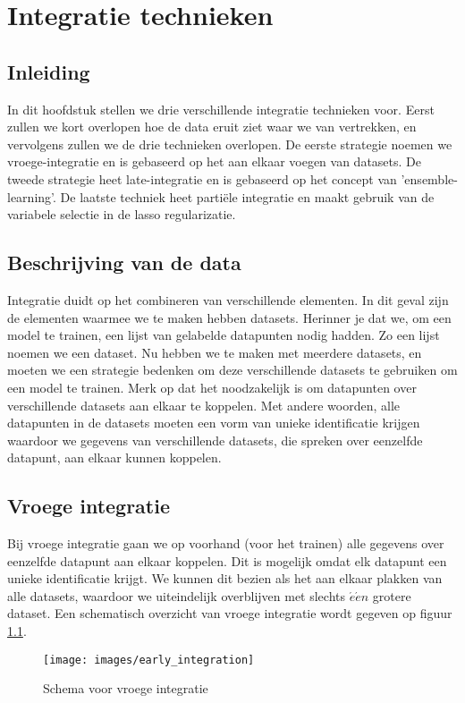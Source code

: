 \chapter{Integratie technieken}
\label{cha:D:integratie}

\section{Inleiding}
\label{sec:D:integratie-inleiding}
In dit hoofdstuk stellen we drie verschillende integratie technieken voor. Eerst zullen we kort overlopen hoe de data eruit ziet waar we van vertrekken, en vervolgens zullen we de drie technieken overlopen. De eerste strategie noemen we vroege-integratie en is gebaseerd op het aan elkaar voegen van datasets. De tweede strategie heet late-integratie en is gebaseerd op het concept van 'ensemble-learning'. De laatste techniek heet parti\"ele integratie en maakt gebruik van de variabele selectie in de lasso regularizatie. 

\section{Beschrijving van de data}
\label{sec:D:integratie-beschrijving}
Integratie duidt op het combineren van verschillende elementen. In dit geval zijn de elementen waarmee we te maken hebben datasets. Herinner je dat we, om een model te trainen, een lijst van gelabelde datapunten nodig hadden. Zo een lijst noemen we een dataset. Nu hebben we te maken met meerdere datasets, en moeten we een strategie bedenken om deze verschillende datasets te gebruiken om een model te trainen. Merk op dat het noodzakelijk is om datapunten over verschillende datasets aan elkaar te koppelen. Met andere woorden, alle datapunten in de datasets moeten een vorm van unieke identificatie krijgen waardoor we gegevens van verschillende datasets, die spreken over eenzelfde datapunt, aan elkaar kunnen koppelen.

\section{Vroege integratie}
\label{sec:D:integratie-vroeg}
Bij vroege integratie gaan we op voorhand (voor het trainen) alle gegevens over eenzelfde datapunt aan elkaar koppelen. Dit is mogelijk omdat elk datapunt een unieke identificatie krijgt. We kunnen dit bezien als het aan elkaar plakken van alle datasets, waardoor we uiteindelijk overblijven met slechts $\acute{e}\acute{e}n$ grotere dataset. Een schematisch overzicht van vroege integratie wordt gegeven op figuur \ref{fig:D:integratie-vroeg}.
\begin{figure}
	\centering
	\texttt{[image: images/early\_integration]}
	\caption{Schema voor vroege integratie}
	\label{fig:D:integratie-vroeg}
\end{figure}

